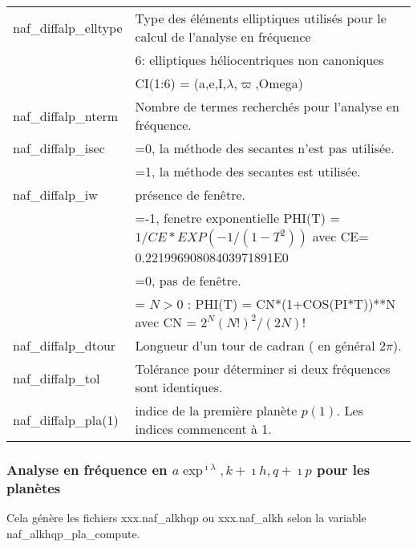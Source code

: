 \documentclass[11pt]{article}
\begin{document}
\begin{tabularx}{\textwidth}{|l|X|}
naf\_diffalp\_elltype  & Type des \'el\'ements elliptiques utilis\'es pour le calcul de l'analyse en fr\'equence\\ 
&6:  elliptiques h\'eliocentriques non canoniques\\
&	     CI(1:6) = (a,e,I,$\lambda$,$\varpi$,Omega)\\ \hline
naf\_diffalp\_nterm  & Nombre de termes recherch\'es pour l'analyse en fr\'equence.\\ \hline
naf\_diffalp\_isec  & =0, la m\'ethode des secantes n'est pas utilis\'ee.\\
&=1, la m\'ethode des secantes est utilis\'ee.\\ \hline
naf\_diffalp\_iw  & pr\'esence de fen\^etre.\\
&=-1, fenetre exponentielle PHI(T) = $1/CE*EXP(-1/(1-T^2))$ avec CE= 0.22199690808403971891E0\\
&=0, pas de fen\^etre.\\
&= $N>0$ : PHI(T) = CN*(1+COS(PI*T))**N avec CN = $2^N(N!)^2/(2N)!$\\ \hline
naf\_diffalp\_dtour  & Longueur d'un tour de cadran ( en g\'en\'eral $2\pi$).\\ \hline
naf\_diffalp\_tol  &  Tol\'erance pour d\'eterminer si deux fr\'equences sont identiques.\\ \hline
naf\_diffalp\_pla(1)   & indice de la premi\`ere plan\`ete $p(1)$. Les indices commencent \`a 1.\\ \hline

 \end{tabularx}

\vspace{0.5cm}
\subsubsection*{Analyse en fr\'equence en $a\exp^{\imath\lambda}, k+\imath h, q+\imath p$ pour les plan\`etes}
Cela g\'en\`ere les fichiers xxx.naf\_alkhqp ou xxx.naf\_alkh selon la variable naf\_alkhqp\_pla\_compute.
\end{document}
